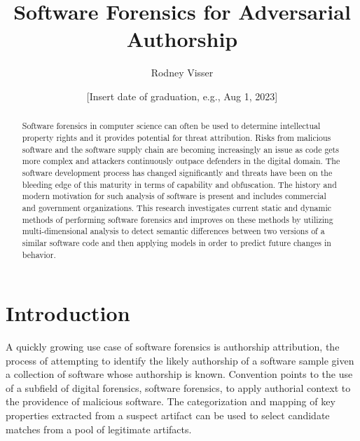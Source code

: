\documentclass[12pt]{report}
\title{Software Forensics for Adversarial Authorship}
\author{Rodney Visser}
\date{[Insert date of graduation, e.g., Aug 1, 2023]} %
\begin{document}
\begin{romanpages}      %
\TitlePage 

\begin{abstract} 
Software forensics in computer science can often be used to determine intellectual property rights and it provides potential for threat attribution.  Risks from malicious software and the software supply chain are becoming increasingly an issue as code gets more complex and attackers continuously outpace defenders in the digital domain.  The software development process has changed significantly and threats have been on the bleeding edge of this maturity in terms of capability and obfuscation. The history and modern motivation for such analysis of software is present and includes commercial and government organizations.  This research investigates current static and dynamic methods of performing software forensics and improves on these methods by utilizing multi-dimensional analysis to detect semantic differences between two versions of a similar software code and then applying models in order to predict future changes in behavior.
\end{abstract}


\tableofcontents
\listoffigures

\printnomenclature[0.5in] %
\end{romanpages}        %


\normalem       %
\chapter{Introduction}  
\label{chap:one}

A quickly growing use case of software forensics is authorship attribution, the process of attempting to identify the likely authorship of a software sample given a collection of software whose authorship is known.  Convention points to the use of a subfield of digital forensics, software forensics,  to apply authorial context to the providence of malicious software.  The categorization and mapping of key properties extracted from a suspect artifact can be used to select candidate matches from a pool of legitimate artifacts.
\end{document}

